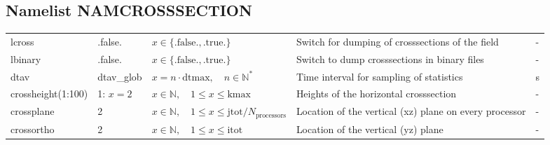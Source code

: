 \documentclass[twoside,11pt,fleqn,a4paper,english,openright]{report}
\begin{document}
\subsection{Namelist NAMCROSSSECTION}\label{par:crosssection}

\begin{center}
  \tablelasttail{
        &&&&\\\hline
  }
\begin{supertabular}{|l|p{1.6cm}|p{4cm}|p{6cm}|l|}
  lcross	& .false.	& $x\in\{\text{.false.},\text{.true.}\}$	& Switch for dumping of crosssections of the field	& -\\
  lbinary	& .false.	& $x\in\{\text{.false.},\text{.true.}\}$	& Switch to dump crosssections in binary files	& -\\
  dtav		& dtav\_glob	& $x = n \cdot \text{dtmax}, \quad n \in \mathbb{N}^*$	& Time interval for sampling of statistics	& s\\
  crossheight(1:100)& 1: $x=2$ & $x \in \mathbb{N}, \quad 1 \leq x \leq \text{kmax}$	& Heights of the horizontal crosssection		& -\\
  crossplane	& 2		& $x \in \mathbb{N}, \quad 1 \leq x \leq {\text{jtot}}/{N_\text{processors}}$	& Location of the vertical (xz) plane on every processor& -\\
  crossortho	& 2	& $x \in \mathbb{N}, \quad 1 \leq x \leq \text{itot}$	& Location of the vertical (yz) plane & - \\
\end{supertabular}
\end{center}
\end{document}
